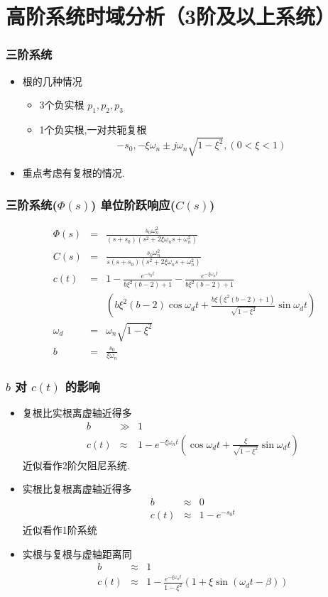 \documentclass{beamer}
\begin{document}
\section{高阶系统时域分析（3阶及以上系统）}
\label{sec-5}
\begin{frame}
\frametitle{三阶系统}
\label{sec-5-1}

\begin{itemize}
\item <2-> 根的几种情况
\begin{itemize}
\item <3-> 3个负实根 $p_1,p_2,p_3$
\item <4-> 1个负实根,一对共轭复根 
      \[-s_0,-\xi\omega_n\pm j\omega_n\sqrt{1-\xi^2},(0<\xi<1)\]
\end{itemize}
\item <5-> 重点考虑有复根的情况.
\end{itemize}
\end{frame}
\begin{frame}
\frametitle{三阶系统($\Phi(s)$) 单位阶跃响应($C(s)$)}
\label{sec-5-2}

\begin{eqnarray*}
 \Phi(s) & = & \frac{s_0\omega_n^2}{(s+s_0)(s^2+2\xi\omega_n s+\omega_n^2)} \\
 C(s) &=& \frac{s_0\omega_n^2}{s(s+s_0)(s^2+2\xi\omega_n s+\omega_n^2)} \\
 c(t) &=& 1-\frac{e^{-s_0 t}}{b\xi^2(b-2)+1}-\frac{e^{-\xi\omega_n t}}{b\xi^2(b-2)+1} \\
     & & \left(b\xi^2(b-2)\cos\omega_d t + \frac{b\xi(\xi^2(b-2)+1)}{\sqrt{1-\xi^2}}\sin\omega_d t\right) \\
 \omega_d &=& \omega_n\sqrt{1-\xi^2} \\
 b &=& \frac{s_0}{\xi\omega_n}
\end{eqnarray*}
\end{frame}
\begin{frame}
\frametitle{$b$ 对 $c(t)$ 的影响}
\label{sec-5-3}


\begin{itemize}
\item <2->复根比实根离虚轴近得多
     \begin{eqnarray*}
     b & \gg & 1\\
     c(t) &\approx & 1-e^{-\xi\omega_n t}\left(\cos\omega_d t + \frac{\xi}{\sqrt{1-\xi^2}}\sin\omega_d t\right) 
     \end{eqnarray*}
     近似看作2阶欠阻尼系统.
\item <3->实根比复根离虚轴近得多
     \begin{eqnarray*}
     b & \approx & 0\\
     c(t) &\approx & 1-e^{-s_0 t}
     \end{eqnarray*}
     近似看作1阶系统
\item <4->实根与复根与虚轴距离同
     \begin{eqnarray*}
     b & \approx & 1\\
     c(t) &\approx & 1-\frac{e^{-\xi\omega_n t}}{1-\xi^2}\left(1+\xi\sin(\omega_d t-\beta)\right) 
     \end{eqnarray*}
\end{itemize}
\end{frame}
\end{document}
